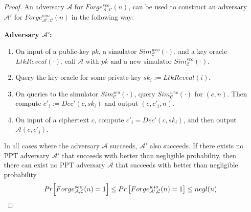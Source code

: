 \begin{proof}
An adversary $\mathcal{A}$ for $Forge^{seo}_{\mathcal{A}, \mathcal{C}}(n)$, can be used to construct an adversary $\mathcal{A'}$ for  $Forge^{wio}_{\mathcal{A'}, \mathcal{C}}(n)$ in the following way:
\newline

\textbf{Adversary $\mathcal{A}'$:}
\begin{enumerate}
    \item On input of a public-key $pk$, a simulator $Sim^{weo}_\mathcal{C}(\cdot)$, and a key oracle $LtkReveal(\cdot)$, call $\mathcal{A}$ with $pk$ and a new simulator $Sim^{seo}_\mathcal{C}(\cdot)$.
    
    \item Query the key oracle for some private-key $sk_i := LtkReveal(i)$.
    
    \item On queries to the simulator $Sim^{seo}_\mathcal{C}(\cdot)$, query $Sim^{weo}_\mathcal{C}(\cdot)$ for $( c,n )$. Then compute $c'_{i} := Dec'(c,sk_{i})$ and output $( c, c'_{i}, n )$.
    
    \item On input of a ciphertext $c$, compute $c'_i = Dec'(c,sk_{i})$, and then output $\mathcal{A}(c,c'_i)$.
\end{enumerate}

In all cases where the adversary $\mathcal{A}$ succeeds, $\mathcal{A'}$ also succeeds. If there exists no PPT adversary $\mathcal{A'}$ that succeeds with better than negligible probability, then there can exist no PPT adversary $\mathcal{A}$ that succeeds with better than negligible probability
{\setlength{\mathindent}{0cm}
\begin{align*}
&& Pr\Bigl[ Forge^{seo}_{\mathcal{A}, \mathcal{C}}(n)  = 1 \Bigr] \leq Pr\left[ Forge^{wio}_{\mathcal{A'}, \mathcal{C}}(n)  = 1 \right] \leq negl(n)
\end{align*}}
\end{proof}

\begin{comment}
Informally, under the assumption that publishing a partial decryption of a cipher  increases the probability of indistinguishable for any PPT adversary at most negligible
{\setlength{\mathindent}{0cm}
\begin{align*}
&& \Bigl| Pr\left[ PubK^{eav}_{\mathcal{A'}, \Pi}(n)  = 1 \right]  - Pr\left[ PubK^{eav}_{\mathcal{A'}, \Pi'}(n)  = 1 \right] \Bigr| \leq negl(n)
\end{align*}}
where $\Pi$ is ElGamal, and $\Pi'$ is Distributed ElGamal, then our protocol has unforgeability under internal observation. We have not been able to find a proof for above equation, but given that the probability of distinguishing a cipher from a partially decrypted cipher is negligible under the DDH assumption~\cite[page 321]{katz2014introduction}, then we find this to be a reasonable assumption.
\end{comment}

